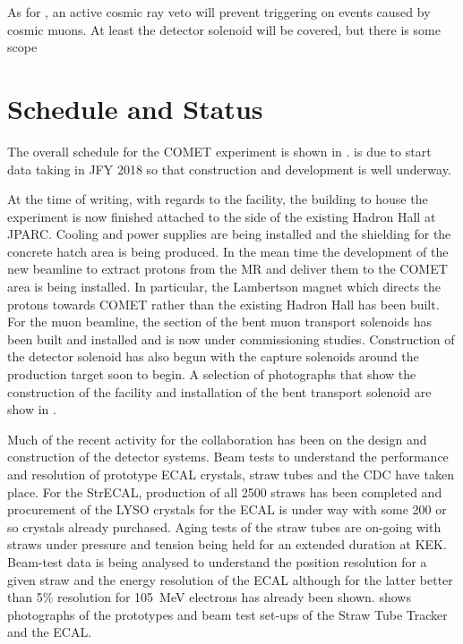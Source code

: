 As for \phaseI, an active cosmic ray veto will prevent triggering on events caused by cosmic muons.
At least the detector solenoid will be covered, but there is some scope


\section{Schedule and Status}
\FigSchedule
The overall schedule for the COMET experiment is shown in .
\phaseI is due to start data taking in \ac{JFY} 2018 so that construction and development is well underway.

\FigStatusFacility
At the time of writing, with regards to the facility, the building to house the experiment is now finished attached to the side of the existing Hadron Hall at \ac{JPARC}.
Cooling and power supplies are being installed and the shielding for the concrete hatch area is being produced.
In the mean time the development of the new beamline to extract protons from the \ac{MR} and deliver them to the COMET area is being installed.
In particular, the Lambertson magnet which directs the protons towards COMET rather than the existing Hadron Hall has been built.
For the muon beamline, the \phaseI section of the bent muon transport solenoids has been built and installed and is now under commissioning studies.
Construction of the detector solenoid has also begun with the capture solenoids around the production target soon to begin.
A selection of photographs that show the construction of the facility and installation of the bent transport solenoid are show in .

\FigStatusStrECAL
Much of the recent activity for the collaboration has been on the design and construction of the detector systems.
Beam tests to understand the performance and resolution of prototype ECAL crystals, straw tubes and the \ac{CDC} have taken place.
For the \ac{StrECAL}, production of all 2500 \phaseI straws has been completed and procurement of the \ac{LYSO} crystals for the ECAL is under way with some 200 or so crystals already purchased.
Aging tests of the straw tubes are on-going with straws under pressure and tension being held for an extended duration at KEK.
Beam-test data is being analysed to understand the position resolution for a given straw and the energy resolution of the ECAL although for the latter better than 5\% resolution for 105~MeV electrons has already been shown.
 shows photographs of the prototypes and beam test set-ups of the Straw Tube Tracker and the ECAL.

